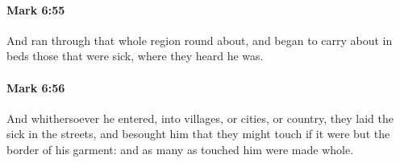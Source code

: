 		\paragraph{Mark 6:55} %
			\label{MARK-6-55}

			And ran through that whole region round about, and began to carry about in beds those that were sick, where they heard he was.

			\begin{framed}
			\scriptsize
				\begin{compactdesc}
					\item[SBLG] 
				\end{compactdesc}
			\end{framed}

		\paragraph{Mark 6:56} %
			\label{MARK-6-56}

			And whithersoever he entered, into villages, or cities, or country, they laid the sick in the streets, and besought him that they might touch if it were but the border of his garment: and as many as touched him were made whole.

